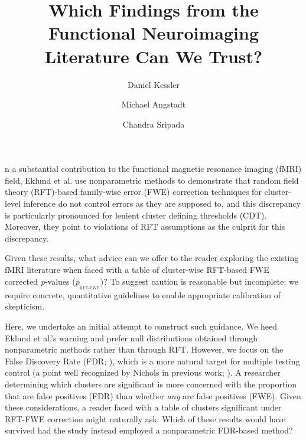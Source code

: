 \documentclass[9pt,twocolumn,twoside]{pnas-new}
\title{Which Findings from the Functional Neuroimaging Literature Can We Trust?}
\author[a,1,2]{Daniel Kessler}
\author[a,1]{Michael Angstadt}
\author[a,1]{Chandra Sripada}
\affil[a]{Department of Psychiatry, University of Michigan, Ann Arbor}
\newcommand{\subtext}[2]{
#1_{_{\text{#2}}}
}
\begin{document}
\verticaladjustment{-2pt}

\maketitle
\thispagestyle{firststyle}




n a substantial contribution to the functional magnetic resonance imaging (fMRI) field, Eklund et al. \cite{eklund16} use nonparametric methods to demonstrate that random field theory (RFT)-based family-wise error (FWE) correction techniques for cluster-level inference do not control errors as they are supposed to, and this discrepancy is particularly pronounced for lenient cluster defining thresholds (CDT). 
Moreover, they point to violations of RFT assumptions as the culprit for this discrepancy.

Given these results, what advice can we offer to the reader exploring the existing fMRI literature when faced with a table of cluster-wise RFT-based FWE corrected \textit{p}-values ($\subtext{p}{RFT-FWE}$)? 
To suggest caution is reasonable but incomplete; we require concrete, quantitative guidelines to enable appropriate calibration of skepticism.

Here, we undertake an initial attempt to construct such guidance.
We heed Eklund et al.'s warning and prefer null distributions obtained through nonparametric methods rather than through RFT.
However, we focus on the False Discovery Rate (FDR; \cite{fdr}), which is a more natural target for multiple testing control (a point well recognized by Nichols in previous work; \cite{genovese02}).
A researcher determining which clusters are significant is more concerned with the proportion that are false positives (FDR) than whether \textit{any} are false positives (FWE).
Given these considerations, a reader faced with a table of clusters significant under RFT-FWE correction might naturally ask: Which of these results would have survived had the study instead employed a nonparametric FDR-based method?
\end{document}
